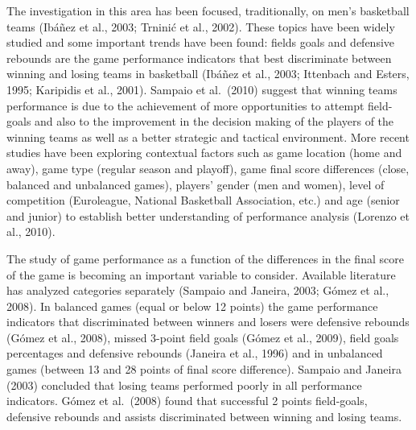 \documentclass[
]{article}
\begin{document}
The investigation in this area has been focused, traditionally, on men's
basketball teams (Ibáñez et al., 2003; Trninić et al., 2002). These
topics have been widely studied and some important trends have been
found: fields goals and defensive rebounds are the game performance
indicators that best discriminate between winning and losing teams in
basketball (Ibáñez et al., 2003; Ittenbach and Esters, 1995; Karipidis
et al., 2001). Sampaio et al.~(2010) suggest that winning teams
performance is due to the achievement of more opportunities to attempt
field-goals and also to the improvement in the decision making of the
players of the winning teams as well as a better strategic and tactical
environment. More recent studies have been exploring contextual factors
such as game location (home and away), game type (regular season and
playoff), game final score differences (close, balanced and unbalanced
games), players' gender (men and women), level of competition
(Euroleague, National Basketball Association, etc.) and age (senior and
junior) to establish better understanding of performance analysis
(Lorenzo et al., 2010).

The study of game performance as a function of the differences in the
final score of the game is becoming an important variable to consider.
Available literature has analyzed categories separately (Sampaio and
Janeira, 2003; Gómez et al., 2008). In balanced games (equal or below 12
points) the game performance indicators that discriminated between
winners and losers were defensive rebounds (Gómez et al., 2008), missed
3-point field goals (Gómez et al., 2009), field goals percentages and
defensive rebounds (Janeira et al., 1996) and in unbalanced games
(between 13 and 28 points of final score difference). Sampaio and
Janeira (2003) concluded that losing teams performed poorly in all
performance indicators. Gómez et al.~(2008) found that successful 2
points field-goals, defensive rebounds and assists discriminated between
winning and losing teams.
\end{document}
